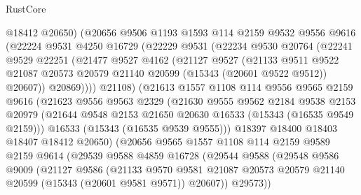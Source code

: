 \begin{lexlean}{RustCore}
\begin{coremodule}
            @18412
            @20650)
          (@20656
            @9506
            @1193
            @1593
            @114
            @2159
            @9532
            @9556
            @9616
            (@22224
              @9531
              @4250
              @16729
              (@22229
                @9531
                (@22234
                  @9530
                  @20764
                  (@22241
                    @9529
                    @22251
                    (@21477
                      @9527
                      @4162
                      (@21127
                        @9527
                        (@21133
                          @9511
                          @9522
                          @21087
                          @20573
                          @20579
                          @21140
                          @20599
                          (@15343 (@20601 @9522 @9512))
                          @20607))
                      @20869))))
              @21108)
            (@21613
              @1557
              @1108
              @114
              @9556
              @9565
              @2159
              @9616
              (@21623
                @9556
                @9563
                @2329
                (@21630
                  @9555
                  @9562
                  @2184
                  @9538
                  @2153
                  @20979
                  (@21644 @9548 @2153 @21650 @20630 @16533 (@15343 (@16535 @9549 @2159)))
                  @16533
                  (@15343 (@16535 @9539 @9555)))
                @18397
                @18400
                @18403
                @18407
                @18412
                @20650)
              (@20656
                @9565
                @1557
                @1108
                @114
                @2159
                @9589
                @2159
                @9614
                (@29539
                  @9588
                  @4859
                  @16728
                  (@29544
                    @9588
                    (@29548
                      @9586
                      @9009
                      (@21127
                        @9586
                        (@21133
                          @9570
                          @9581
                          @21087
                          @20573
                          @20579
                          @21140
                          @20599
                          (@15343 (@20601 @9581 @9571))
                          @20607))
                      @29573))

\end{coremodule}
\end{lexlean}
